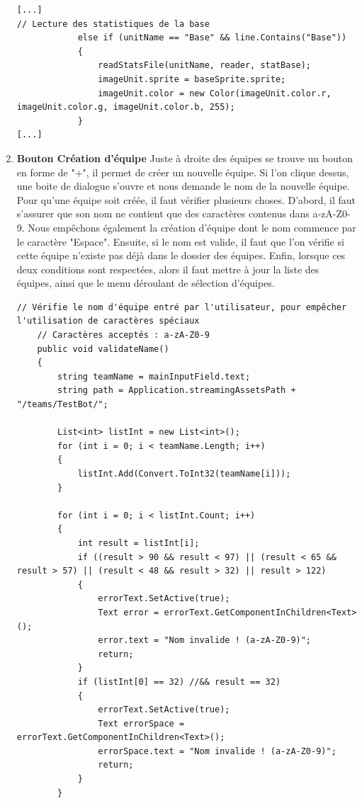 \documentclass{report}
\begin{document}
\begin{enumerate}[label=\Alph*)]
\begin{lstlisting}[language={[Sharp]C},label={lst:ReadStats()()}, caption= Extrait du code de StatsLoader.cs]
[...]
// Lecture des statistiques de la base
            else if (unitName == "Base" && line.Contains("Base"))
            {
                readStatsFile(unitName, reader, statBase);
                imageUnit.sprite = baseSprite.sprite;
                imageUnit.color = new Color(imageUnit.color.r, imageUnit.color.g, imageUnit.color.b, 255);
            }
[...]
\end{lstlisting}	
\item\textbf{Bouton Création d'équipe} \newline
Juste à droite des équipes se trouve un bouton en forme de "+", il permet de créer un nouvelle équipe. Si l'on clique dessus, une boite de dialogue s'ouvre et nous demande le nom de la nouvelle équipe. Pour qu'une équipe soit créée, il faut vérifier plusieurs choses. D'abord, il faut s'assurer que son nom ne contient que des caractères contenus dans a-zA-Z0-9. Nous empêchons également la création d'équipe dont le nom commence par le caractère "Espace". Ensuite, si le nom est valide, il faut que l'on vérifie si cette équipe n'existe pas déjà dans le dossier des équipes.\newline
Enfin, lorsque ces deux conditions sont respectées, alors il faut mettre à jour la liste des équipes, ainsi que le menu déroulant de sélection d'équipes.
\begin{lstlisting}[language={[Sharp]C},label={lst:validateName()}, caption= Extrait du code de CreateTeam.cs]
// Vérifie le nom d'équipe entré par l'utilisateur, pour empêcher l'utilisation de caractères spéciaux
    // Caractères acceptés : a-zA-Z0-9
    public void validateName()
    {
        string teamName = mainInputField.text;
        string path = Application.streamingAssetsPath + "/teams/TestBot/";

        List<int> listInt = new List<int>();
        for (int i = 0; i < teamName.Length; i++)
        {
            listInt.Add(Convert.ToInt32(teamName[i]));
        }

        for (int i = 0; i < listInt.Count; i++)
        {
            int result = listInt[i];
            if ((result > 90 && result < 97) || (result < 65 && result > 57) || (result < 48 && result > 32) || result > 122)
            {
                errorText.SetActive(true);
                Text error = errorText.GetComponentInChildren<Text>();
                error.text = "Nom invalide ! (a-zA-Z0-9)";
                return;
            }
            if (listInt[0] == 32) //&& result == 32)
            {
                errorText.SetActive(true);
                Text errorSpace = errorText.GetComponentInChildren<Text>();
                errorSpace.text = "Nom invalide ! (a-zA-Z0-9)";
                return;
            }
        }


\end{lstlisting}
\end{enumerate}
\end{document}
